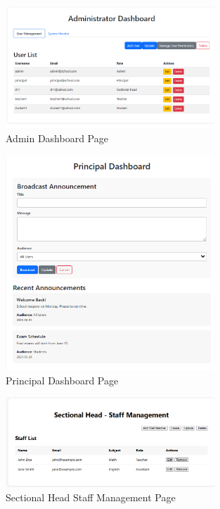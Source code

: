 \documentclass[12pt,a4paper]{report}
\begin{document}
\begin{figure}[htbp]
    \centering
    \includegraphics[width=0.7\textwidth]{admin-dashboard-page.png}
    \caption{Admin Dashboard Page}
    \label{fig:admin-dashboard-page}
\end{figure}

\begin{figure}[htbp]
    \centering
    \includegraphics[width=0.7\textwidth]{principal-dashboard-page.png}
    \caption{Principal Dashboard Page}
    \label{fig:principal-dashboard-page}
\end{figure}

\begin{figure}[htbp]
    \centering
    \includegraphics[width=0.7\textwidth]{sectionalhead-staff managemnet page.png}
    \caption{Sectional Head Staff Management Page}
    \label{fig:sectionalhead-staff-managemnet-page}
\end{figure}
\end{document}
